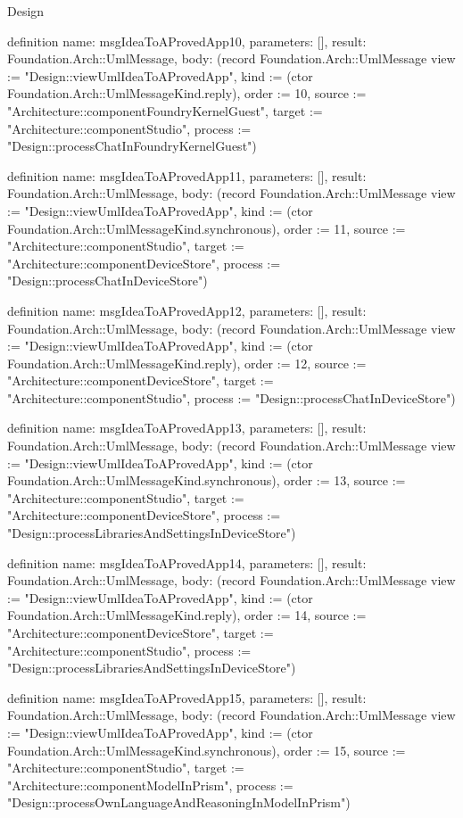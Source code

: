 \begin{lexlean}{Design}
\begin{semanticmodule}
definition{
  name: msgIdeaToAProvedApp10,
  parameters: [],
  result: Foundation.Arch::UmlMessage,
  body: (record Foundation.Arch::UmlMessage {view := "Design::viewUmlIdeaToAProvedApp", kind := (ctor Foundation.Arch::UmlMessageKind.reply), order := 10, source := "Architecture::componentFoundryKernelGuest", target := "Architecture::componentStudio", process := "Design::processChatInFoundryKernelGuest"})
}

definition{
  name: msgIdeaToAProvedApp11,
  parameters: [],
  result: Foundation.Arch::UmlMessage,
  body: (record Foundation.Arch::UmlMessage {view := "Design::viewUmlIdeaToAProvedApp", kind := (ctor Foundation.Arch::UmlMessageKind.synchronous), order := 11, source := "Architecture::componentStudio", target := "Architecture::componentDeviceStore", process := "Design::processChatInDeviceStore"})
}

definition{
  name: msgIdeaToAProvedApp12,
  parameters: [],
  result: Foundation.Arch::UmlMessage,
  body: (record Foundation.Arch::UmlMessage {view := "Design::viewUmlIdeaToAProvedApp", kind := (ctor Foundation.Arch::UmlMessageKind.reply), order := 12, source := "Architecture::componentDeviceStore", target := "Architecture::componentStudio", process := "Design::processChatInDeviceStore"})
}

definition{
  name: msgIdeaToAProvedApp13,
  parameters: [],
  result: Foundation.Arch::UmlMessage,
  body: (record Foundation.Arch::UmlMessage {view := "Design::viewUmlIdeaToAProvedApp", kind := (ctor Foundation.Arch::UmlMessageKind.synchronous), order := 13, source := "Architecture::componentStudio", target := "Architecture::componentDeviceStore", process := "Design::processLibrariesAndSettingsInDeviceStore"})
}

definition{
  name: msgIdeaToAProvedApp14,
  parameters: [],
  result: Foundation.Arch::UmlMessage,
  body: (record Foundation.Arch::UmlMessage {view := "Design::viewUmlIdeaToAProvedApp", kind := (ctor Foundation.Arch::UmlMessageKind.reply), order := 14, source := "Architecture::componentDeviceStore", target := "Architecture::componentStudio", process := "Design::processLibrariesAndSettingsInDeviceStore"})
}

definition{
  name: msgIdeaToAProvedApp15,
  parameters: [],
  result: Foundation.Arch::UmlMessage,
  body: (record Foundation.Arch::UmlMessage {view := "Design::viewUmlIdeaToAProvedApp", kind := (ctor Foundation.Arch::UmlMessageKind.synchronous), order := 15, source := "Architecture::componentStudio", target := "Architecture::componentModelInPrism", process := "Design::processOwnLanguageAndReasoningInModelInPrism"})
}


\end{semanticmodule}
\end{lexlean}
